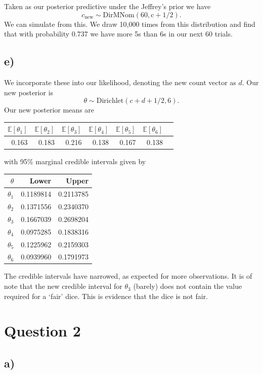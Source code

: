 \documentclass[12pt]{extarticle}
\newcommand{\E}{\mathbb{E}}
\begin{document}
Taken as our posterior predictive under the Jeffrey's prior we have $$c_{\text{new}}\sim \mathrm{DirMNom(60, c + 1/2)}.$$
We can simulate from this. We draw 10,000 times from this distribution and find that with probability 0.737 we have more 5s than 6s in our next 60 trials.

\subsection*{e)}
We incorporate these into our likelihood, denoting the new count vector as $d$. Our new posterior is $$\theta \sim \mathrm{Dirichlet}(c+d+1/2, 6).$$ Our new posterior means are 
\begin{table}[H]
	\centering
	\begin{tabular}{rrrrrrr}
		\hline
		$\E\left[\theta_1\right]$ & $\E\left[\theta_2\right]$ & $\E\left[\theta_3\right]$ & $\E\left[\theta_4\right]$ & $\E\left[\theta_5\right]$ & $\E\left[\theta_6\right]$ \\ 
		\hline
		0.163 &0.183 &0.216 &0.138 &0.167 &0.138 \\ 
		\hline
	\end{tabular}
\end{table}
with 95\% marginal credible intervals given by 
\begin{table}[H]
	\centering
	\begin{tabular}{r|rr}
		\hline
		$\theta$ & Lower & Upper\\
		\hline
		$\theta_1$ &0.1189814 &0.2113785\\
		$\theta_2$ &0.1371556 &0.2340370\\
		$\theta_3$ &0.1667039 &0.2698204\\
		$\theta_4$ &0.0975285 &0.1838316\\
		$\theta_5$ &0.1225962 &0.2159303\\
		$\theta_6$ &0.0939960 &0.1791973\\
	\end{tabular}
\end{table}
The credible intervals have narrowed, as expected for more observations. It is of note that the new credible interval for $\theta_3$ (barely) does not contain the value required for a `fair' dice. This is evidence that the dice is not fair. 

\section*{Question 2}

\subsection*{a)}
\end{document}
